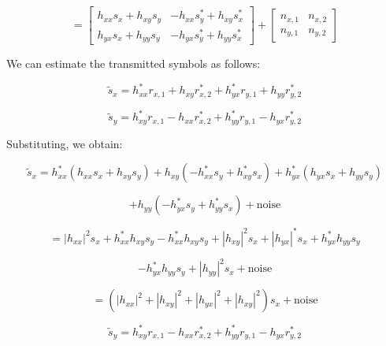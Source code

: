 \documentclass[fleqn]{article}
\begin{document}
\begin{enumerate}
		\begin{equation*}
				 = \begin{bmatrix}
				h_{xx}s_x + h_{xy}s_y & -h_{xx}s_y^* + h_{xy}s_x^* \\
				h_{yx}s_x + h_{yy}s_y & -h_{yx}s_y^* + h_{yy}s_x^*
			\end{bmatrix} + \begin{bmatrix}
				n_{x,1} & n_{x,2} \\
				n_{y,1} & n_{y,2}
			\end{bmatrix}
		\end{equation*}
		
		We can estimate the transmitted symbols as follows:
		
		\begin{equation*}
			\tilde{s}_x = h_{xx}^*r_{x,1} + h_{xy}r_{x,2}^* + h_{yx}^*r_{y,1} + h_{yy}r_{y,2}^*
		\end{equation*}
		
		\begin{equation*}
			\tilde{s}_y = h_{xy}^*r_{x,1} - h_{xx}r_{x,2}^* + h_{yy}^*r_{y,1} - h_{yx}r_{y,2}^*
		\end{equation*}
		
		Substituting, we obtain:
		
		\begin{equation*}
			\tilde{s}_x = h_{xx}^*(h_{xx}s_x + h_{xy}s_y) + h_{xy}(-h_{xx}^*s_y + h_{xy}^*s_x) + h_{yx}^*(h_{yx}s_x + h_{yy}s_y)
		\end{equation*}
		
		\begin{equation*}
			 + h_{yy}(-h_{yx}^*s_y + h_{yy}^*s_x) + \text{noise}
		\end{equation*}
		
		\begin{equation*}
			= |h_{xx}|^2s_x + h_{xx}^*h_{xy}s_y - h_{xx}^*h_{xy}s_y + |h_{xy}|^2s_x + |h_{yx}|^*s_x + h_{yx}^*h_{yy}s_y
		\end{equation*}
		
		\begin{equation*}
			- h_{yx}^*h_{yy}s_y + |h_{yy}|^2s_x + \text{noise}
		\end{equation*}
		
		\begin{equation*}
			= (|h_{xx}|^2 + |h_{xy}|^2 + |h_{yx}|^2 + |h_{xy}|^2)s_x + \text{noise}
		\end{equation*}
		
		\begin{equation*}
			\tilde{s}_y = h_{xy}^*r_{x,1} - h_{xx}r_{x,2}^* + h_{yy}^*r_{y,1} - h_{yx}r_{y,2}^*
		\end{equation*}
		

\end{enumerate}
\end{document}

